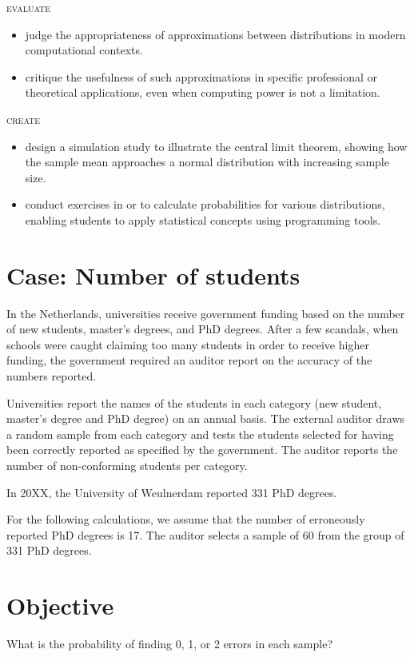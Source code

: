 \noindent \textsc{evaluate}
\begin{itemize}


\item judge the appropriateness of approximations between distributions in modern computational contexts.
\item critique the usefulness of such approximations in specific professional or theoretical applications, even when computing power is not a limitation.
\end{itemize}

\noindent \textsc{create}
\begin{itemize}


\item design a simulation study to illustrate the central limit theorem, showing how the sample mean approaches a normal distribution with increasing sample size.
\item conduct exercises in  or  to calculate probabilities for various distributions, enabling students to apply statistical concepts using programming tools.

\end{itemize}

\begin{mdframed}[hidealllines=true,backgroundcolor=KPMG_blue!10, innerleftmargin=0.3cm]
\section*{Case: Number of students}
In the Netherlands, universities receive government funding based on the number of new students, master's degrees, and PhD degrees. After a few scandals, when schools were caught claiming too many students in order to receive higher funding, the government required an auditor report on the accuracy of the numbers reported.

Universities report the names of the students in each category (new student, master's degree and PhD degree) on an annual basis. The external auditor draws a random sample from each category and tests the students selected for having been correctly reported as specified by the government. The auditor reports  the number of non-conforming students per category.

In 20XX, the University of Weulnerdam reported 331 PhD degrees. 

For the following calculations, we assume that the number of erroneously reported PhD degrees is 17. The auditor selects a sample of 60 from the group of 331 PhD degrees.

\section*{Objective}
What is the probability of finding 0, 1, or 2 errors in each sample?
\end{mdframed}


